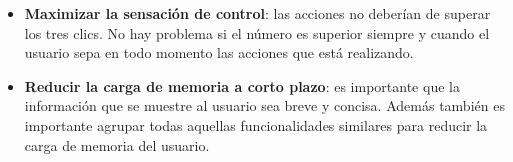 \begin{itemize}
	\item \textbf{Maximizar la sensación de control}:  las acciones no deberían de superar los tres clics. No hay problema si el número es superior siempre y cuando el usuario sepa en todo momento las acciones que está realizando. 
	
	\item \textbf{Reducir la carga de memoria a corto plazo}: es importante que la información que se muestre al usuario sea breve y concisa. Además también es importante agrupar todas aquellas funcionalidades similares para reducir la carga de memoria del usuario.
	
\end{itemize}


